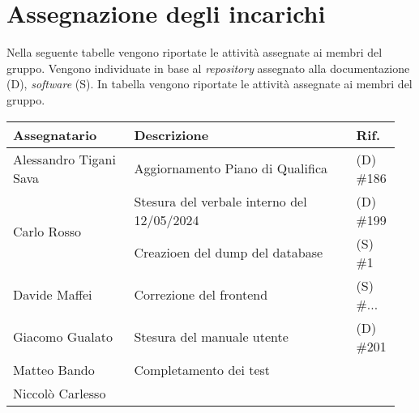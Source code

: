 \section{Assegnazione degli incarichi}
Nella seguente tabelle vengono riportate le attività assegnate ai membri del 
gruppo. Vengono individuate in base al \textit{repository} assegnato alla 
documentazione (D), \textit{software} (S).
In tabella vengono riportate le attività assegnate ai membri del gruppo.
\begin{center}
	{
		\renewcommand{\arraystretch}{1.5}
		\begin{tabular}{p{0.30\linewidth}|p{0.55\linewidth}|p{0.10\linewidth}}
			\textbf{Assegnatario}        & \textbf{Descrizione} & \textbf{Rif.} \\

			\hline
			Alessandro Tigani Sava       & Aggiornamento Piano di Qualifica				& (D) \#186	\\
			\hline
			\multirow{2}{*}{Carlo Rosso} & Stesura del verbale interno del 12/05/2024	& (D) \#199 \\
			\cline{2-3}
			                             & Creazioen del dump del database				& (S) \#1   \\
			\hline
			Davide Maffei                & Correzione del frontend						& (S) \#... \\
			\hline
			Giacomo Gualato				 & Stesura del manuale utente					& (D) \#201 \\
			\hline
			Matteo Bando                 & Completamento dei test						&			\\
			\hline
			Niccolò Carlesso             &												&			\\
			\hline
		\end{tabular}
	}
\end{center}

